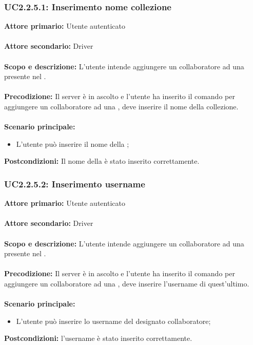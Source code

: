 \documentclass{scalatekids-article}
\begin{document}
\subsubsection{UC2.2.5.1: Inserimento nome collezione}

\textbf{Attore primario:} Utente autenticato\\ \\
\textbf{Attore secondario:} Driver\\ \\
\textbf{Scopo e descrizione:} L’utente intende aggiungere un collaboratore ad una  presente nel .\\ \\
\textbf{Precodizione:} Il server è in ascolto e l’utente ha inserito il comando per aggiungere un collaboratore ad una , deve inserire il nome della collezione.\\ \\
\textbf{Scenario principale:}
\begin{itemize}
\item L'utente può inserire il nome della ;
\end{itemize}
\textbf{Postcondizioni:} Il nome della  è stato inserito correttamente.

\subsubsection{UC2.2.5.2: Inserimento username}

\textbf{Attore primario:} Utente autenticato\\ \\
\textbf{Attore secondario:} Driver\\ \\
\textbf{Scopo e descrizione:} L’utente intende aggiungere un collaboratore ad una  presente nel .\\ \\
\textbf{Precodizione:} Il server è in ascolto e l’utente ha inserito il comando per aggiungere un collaboratore ad una , deve inserire l'username di quest'ultimo.\\ \\
\textbf{Scenario principale:}
\begin{itemize}
\item L'utente può inserire lo username del designato collaboratore;
\end{itemize}
\textbf{Postcondizioni:} l'username è stato inserito correttamente.
\end{document}
